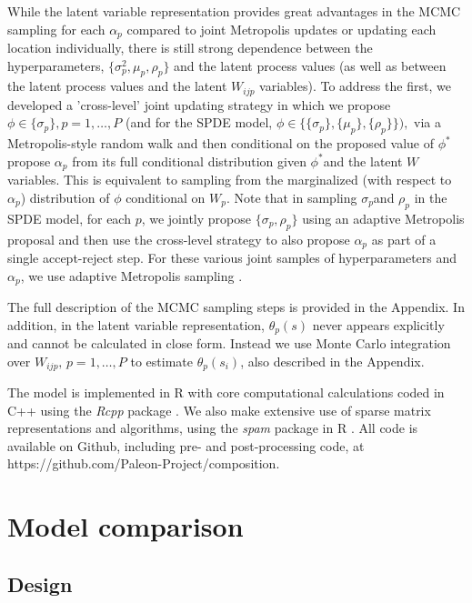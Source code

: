 \documentclass[12pt]{article}\usepackage[]{graphicx}\usepackage[]{color}
\begin{document}
While the latent variable representation provides great advantages
in the MCMC sampling for each $\alpha_{p}$ compared to joint Metropolis
updates or updating each location individually, there is still strong
dependence between the hyperparameters, $\{\sigma_{p}^{2},\mu_{p},\rho_{p}\}$
and the latent process values (as well as between the latent process
values and the latent $W_{ijp}$ variables). To address the first,
we developed a 'cross-level' joint updating strategy in which we propose
$\phi\in\{\sigma_{p}\},p=1,\ldots,P$ (and for the SPDE model, $\phi\in\{\{\sigma_{p}\},\{\mu_{p}\},\{\rho_{p}\}\}),$
via a Metropolis-style random walk and then conditional on the proposed
value of $\phi^{*}$ propose $\alpha_{p}$ from its full conditional
distribution given $\phi^{*}$and the latent $W$ variables. This
is equivalent to sampling from the marginalized (with respect to $\alpha_{p}$)
distribution of $\phi$ conditional on $W_{p}$. Note that in sampling
$\sigma_{p}$and $\rho_{p}$ in the SPDE model, for each $p$, we
jointly propose $\{\sigma_{p},\rho_{p}\}$ using an adaptive Metropolis
proposal and then use the cross-level strategy to also propose $\alpha_{p}$
as part of a single accept-reject step. For these various joint samples
of hyperparameters and $\alpha_{p}$, we use adaptive Metropolis sampling
\citep{Shab:Well:2011}.

The full description of the MCMC sampling steps is provided in the
Appendix. In addition, in the latent variable representation, $\theta_{p}(s)$
never appears explicitly and cannot be calculated in close form. Instead
we use Monte Carlo integration over $W_{ijp},\, p=1,\ldots,P$ to
estimate $\theta_{p}(s_{i})$, also described in the Appendix. 

The model is implemented in R \cite{R:2014} with core computational
calculations coded in C++ using the \emph{Rcpp} package \citep{Edde:Fran:2011}.
We also make extensive use of sparse matrix representations and algorithms,
using the \emph{spam} package in R \citep{Furr:Sain:2010}. All code
is available on Github, including pre- and post-processing code, at
https://github.com/Paleon-Project/composition. 


\section{Model comparison}


\subsection{Design}
\end{document}
